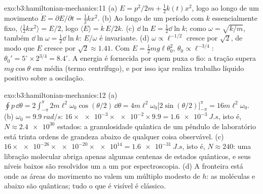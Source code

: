 \begin{solution}{exo:b3:hamiltonian-mechanics:11}
(a) $E = p^2/2m + \tfrac12 k(t)x^2$, logo ao longo de um movimento $\dot E =
\partial E/\partial t = \tfrac12\dot kx^2$. (b) Ao longo de um período
com $k$ essencialmente fixo, $\langle\tfrac12 kx^2\rangle = E/2$, logo
$\langle\dot E\rangle = \dot k\,E/2k$. (c) $\dd\ln E = \tfrac12\dd\ln
k$; como $\omega = \sqrt{k/m}$, também $\dd\ln\omega = \tfrac12\dd\ln k$:
$E/\omega$ é invariante. (d) $\omega \propto \ell^{-1/2}$ cresce
por $\sqrt2$, de modo que $E$ cresce por $\sqrt2 \approx 1.41$. Com $E = \tfrac12
mg\ell\theta_0^2$, $\theta_0 \propto \ell^{-3/4}$: $\theta_0' =
5^\circ \times 2^{3/4} = 8.4^\circ$. A energia é fornecida por quem
puxa o fio: a tração supera $mg\cos\theta$ em média (termo
centrífugo), e por isso içar realiza trabalho líquido positivo sobre a
oscilação.
\end{solution}

\begin{solution}{exo:b3:hamiltonian-mechanics:12}
(a) $\oint p\,\dd\theta = 2\int_{-\pi}^{\pi}2m\ell^2\omega_0
\cos(\theta/2)\,\dd\theta = 4m\ell^2\omega_0\big[2\sin(\theta/2)
\big]_{-\pi}^{\pi} = 16m\ell^2\omega_0$. (b) $\omega_0 =
\qty{9.9}{rad/s}$: $16 \times \num{e-3} \times \num{e-2} \times 9.9 =
\qty{1.6e-3}{J.s}$, isto é, $N \approx \num{2.4e30}$ estados: a
granulosidade quântica de um pêndulo de laboratório está trinta ordens
de grandeza abaixo de qualquer coisa observável. (c) $16 \times \num{e-26} \times
\num{e-20} \times \num{e14} = \qty{1.6e-31}{J.s}$, isto é, $N \approx
240$: uma libração molecular abriga apenas algumas centenas de estados
quânticos, e seus níveis baixos são resolvidos um a um por
espectroscopia. (d) A fronteira está onde as áreas do movimento no
 valem um múltiplo modesto de $h$: as moléculas e
abaixo são quânticas; tudo o que é visível é clássico.
\end{solution}

